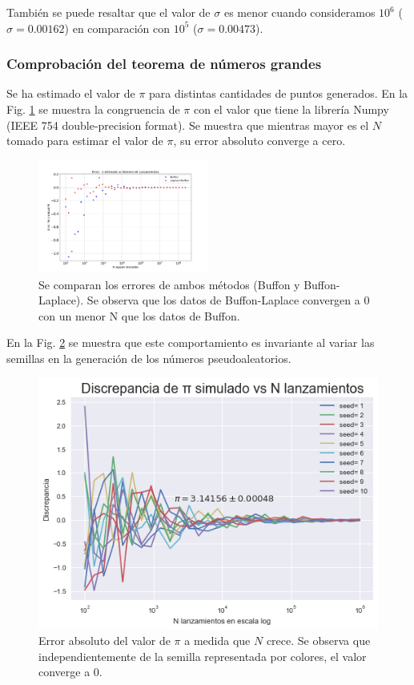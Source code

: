 \documentclass{rbf}
\begin{document}
También se puede resaltar que el valor de $\sigma$ es menor cuando consideramos $10^6$ ($\sigma=0.00162$) en comparación con $10^5$ ($\sigma=0.00473$). 

\subsubsection{Comprobación del teorema de números grandes}

Se ha estimado el valor de $\pi$ para distintas cantidades de puntos generados. En la Fig. \ref{buff11} se muestra la congruencia de $\pi$ con el valor que tiene la librería Numpy (IEEE 754 double-precision format). Se muestra que mientras mayor es el $N$ tomado para estimar el valor de $\pi$, su error absoluto converge a cero.

\begin{figure}[h]
 \centering
  \includegraphics[width=0.5\textwidth]{figures/err.jpg}
    \caption{Se comparan los errores de ambos métodos (Buffon y Buffon-Laplace). Se observa que los datos de Buffon-Laplace convergen a 0 con un menor N que los datos de Buffon.}
 \label{buff11}
\end{figure}


En la Fig. \ref{buff4} se muestra que este comportamiento es invariante al variar las semillas en la generación de los números pseudoaleatorios. 


\begin{figure}[tp]
  \includegraphics[scale=0.5]{figures/errors.png}
    \caption{Error absoluto del valor de $\pi$ a medida que $N$ crece. Se observa que independientemente de la semilla representada por colores, el valor converge a 0.}
 \label{buff4}
\end{figure}
\end{document}
